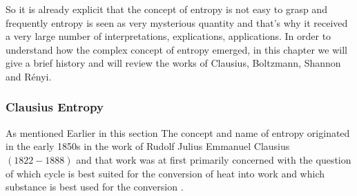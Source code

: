 	So it is already explicit that the concept of entropy is not easy to grasp and frequently entropy is seen as very mysterious quantity and that’s why it received a very large number of interpretations,
	explications, applications. In order to understand how the complex concept of entropy emerged,
	in this chapter we will give a brief history and will review the works of Clausius, Boltzmann,
	Shannon and Rényi.

	\subsubsection{Clausius Entropy}	
	As mentioned Earlier in this section The concept and name of entropy originated in the early
	1850s in the work of Rudolf Julius Emmanuel Clausius $(1822-1888)$ and that work was at first	primarily concerned with the question of which cycle is best suited for the conversion of heat into	work and which substance is best used for the conversion \cite{Clausius1867}.
	
